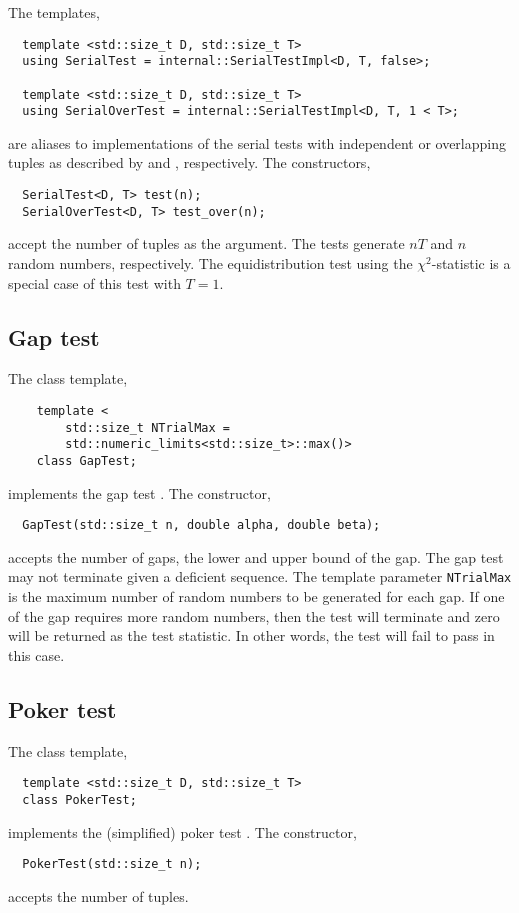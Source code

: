 The templates,
\begin{Verbatim}
  template <std::size_t D, std::size_t T>
  using SerialTest = internal::SerialTestImpl<D, T, false>;

  template <std::size_t D, std::size_t T>
  using SerialOverTest = internal::SerialTestImpl<D, T, 1 < T>;
\end{Verbatim}
are aliases to implementations of the serial tests with independent or
overlapping tuples as described by \cite[pp.~62]{Knuth:1997us} and
\cite[ex.~24, pp.~78]{Knuth:1997us}, respectively. The constructors,
\begin{Verbatim}
  SerialTest<D, T> test(n);
  SerialOverTest<D, T> test_over(n);
\end{Verbatim}
accept the number of tuples as the argument. The tests generate $nT$ and $n$
random numbers, respectively. The equidistribution test using the
$\chi^2$-statistic \cite[pp.~61]{Knuth:1997us} is a special case of this test
with $T = 1$.

\subsection{Gap test}
\label{sub:Gap test}

The class template,
\begin{Verbatim}
    template <
        std::size_t NTrialMax =
        std::numeric_limits<std::size_t>::max()>
    class GapTest;
\end{Verbatim}
implements the gap test \cite[pp.~62]{Knuth:1997us}. The constructor,
\begin{Verbatim}
  GapTest(std::size_t n, double alpha, double beta);
\end{Verbatim}
accepts the number of gaps, the lower and upper bound of the gap. The gap test
may not terminate given a deficient sequence. The template parameter
\verb|NTrialMax| is the maximum number of random numbers to be generated for
each gap. If one of the gap requires more random numbers, then the test will
terminate and zero will be returned as the test statistic. In other words, the
test will fail to pass in this case.

\subsection{Poker test}
\label{sub:Poker test}

The class template,
\begin{Verbatim}
  template <std::size_t D, std::size_t T>
  class PokerTest;
\end{Verbatim}
implements the (simplified) poker test \cite[pp.~63]{Knuth:1997us}. The
constructor,
\begin{Verbatim}
  PokerTest(std::size_t n);
\end{Verbatim}
accepts the number of tuples.

